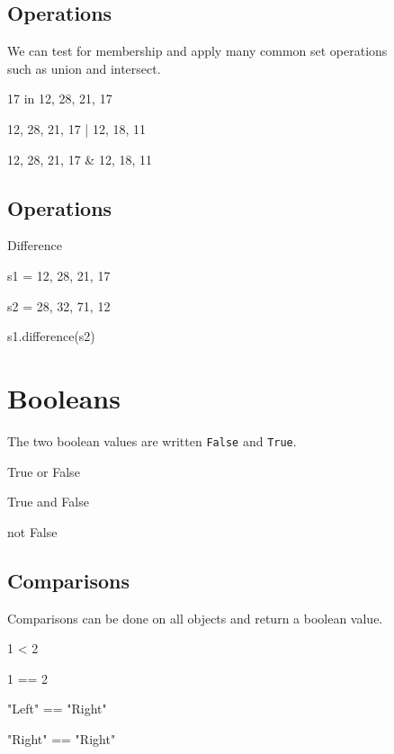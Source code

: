 \documentclass[aspectratio=1610,slidestop]{beamer}
\begin{document}
\subsection{Operations}
\begin{pframe}
We can test for membership and apply many common set operations\\
such as union and intersect.
\medskip

\begin{pyconsole}
17 in {12, 28, 21, 17}

{12, 28, 21, 17} | {12, 18, 11}

{12, 28, 21, 17} & {12, 18, 11}
\end{pyconsole}
\end{pframe}


\subsection{Operations}
\begin{pframe}
 Difference
 \medskip

\begin{pyconsole}
s1 = {12, 28, 21, 17}

s2 = {28, 32, 71, 12}

s1.difference(s2)
\end{pyconsole}
\end{pframe}


\section{Booleans}
\begin{pframe}
The two boolean values are written \texttt{False} and
\texttt{True}.
\begin{pyconsole}
True or False

True and False

not False
\end{pyconsole}
\end{pframe}


\subsection{Comparisons}
\begin{pframe}
  Comparisons can be done on all objects and return a boolean value.
\begin{pyconsole}
1 < 2

1 == 2

"Left" == "Right"

"Right" == "Right"
\end{pyconsole}
\end{pframe}
\end{document}

